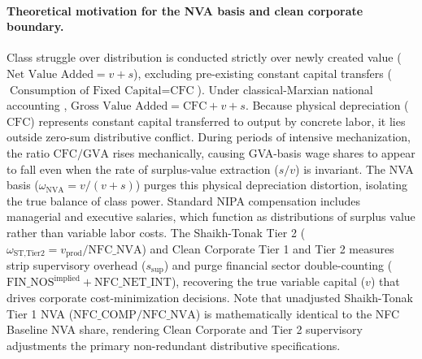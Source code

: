 \paragraph{Theoretical motivation for the NVA basis and clean corporate boundary.}
Class struggle over distribution is conducted strictly over newly created value ($\text{Net Value Added} = v + s$), excluding pre-existing constant capital transfers ($\text{Consumption of Fixed Capital} = \text{CFC}$). Under classical-Marxian national accounting \citep{ShaikhTonak1994}, $\text{Gross Value Added} = \text{CFC} + v + s$. Because physical depreciation ($\text{CFC}$) represents constant capital transferred to output by concrete labor, it lies outside zero-sum distributive conflict. During periods of intensive mechanization, the ratio $\text{CFC}/\text{GVA}$ rises mechanically, causing GVA-basis wage shares to appear to fall even when the rate of surplus-value extraction ($s/v$) is invariant. The NVA basis ($\omega_{\text{NVA}} = v / (v + s)$) purges this physical depreciation distortion, isolating the true balance of class power. Standard NIPA compensation includes managerial and executive salaries, which function as distributions of surplus value rather than variable labor costs. The Shaikh-Tonak Tier 2 ($\omega_{\text{ST,Tier2}} = v_{\text{prod}} / \text{NFC\_NVA}$) and Clean Corporate Tier 1 and Tier 2 measures strip supervisory overhead ($s_{\text{sup}}$) and purge financial sector double-counting ($\text{FIN\_NOS}^{\text{implied}} + \text{NFC\_NET\_INT}$), recovering the true variable capital ($v$) that drives corporate cost-minimization decisions. Note that unadjusted Shaikh-Tonak Tier 1 NVA ($\text{NFC\_COMP} / \text{NFC\_NVA}$) is mathematically identical to the NFC Baseline NVA share, rendering Clean Corporate and Tier 2 supervisory adjustments the primary non-redundant distributive specifications.

